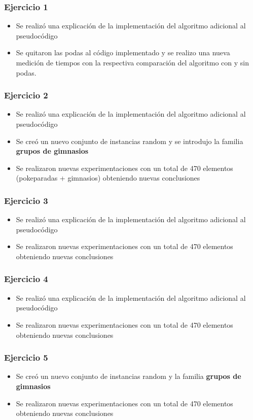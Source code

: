 \subsubsection*{Ejercicio 1}
\begin{itemize}
\item Se realiz\'o una explicaci\'on de la implementaci\'on del algoritmo adicional al pseudoc\'odigo
\item Se quitaron las podas al c\'odigo implementado y se realizo una nueva medici\'on de tiempos con la respectiva comparaci\'on del algoritmo con y sin podas.
\end{itemize}

\subsubsection*{Ejercicio 2}
\begin{itemize}
\item Se realiz\'o una explicaci\'on de la implementaci\'on del algoritmo adicional al pseudoc\'odigo
\item Se creó un nuevo conjunto de instancias random y se introdujo la familia \textbf{grupos de gimnasios}
\item Se realizaron nuevas experimentaciones con un total de 470 elementos (pokeparadas + gimnasios) obteniendo nuevas conclusiones
\end{itemize}

\subsubsection*{Ejercicio 3}
\begin{itemize}
\item Se realiz\'o una explicaci\'on de la implementaci\'on del algoritmo adicional al pseudoc\'odigo
\item Se realizaron nuevas experimentaciones con un total de 470 elementos obteniendo nuevas conclusiones
\end{itemize}

\subsubsection*{Ejercicio 4}
\begin{itemize}
\item Se realiz\'o una explicaci\'on de la implementaci\'on del algoritmo adicional al pseudoc\'odigo
\item Se realizaron nuevas experimentaciones con un total de 470 elementos obteniendo nuevas conclusiones
\end{itemize}

\subsubsection*{Ejercicio 5}
\begin{itemize}
\item Se creó un nuevo conjunto de instancias random y la familia \textbf{grupos de gimnasios}
\item Se realizaron nuevas experimentaciones con un total de 470 elementos obteniendo nuevas conclusiones
\end{itemize}